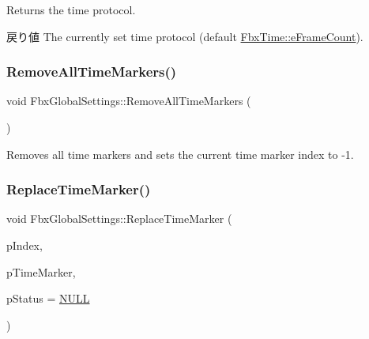Returns the time protocol. \begin{DoxyReturn}{戻り値}
The currently set time protocol (default \hyperlink{class_fbx_time_a10ffa1fdce0aa7f63ec24bdd23afff4bac289d3a9f084368221a07a3c95817bef}{Fbx\+Time\+::e\+Frame\+Count}). 
\end{DoxyReturn}
\mbox{\label{class_fbx_global_settings_ac321c450c9dfd0897993fdcef901bf58}} 
\subsubsection{\texorpdfstring{Remove\+All\+Time\+Markers()}{RemoveAllTimeMarkers()}}
{\footnotesize\ttfamily void Fbx\+Global\+Settings\+::\+Remove\+All\+Time\+Markers (\begin{DoxyParamCaption}{ }\end{DoxyParamCaption})}



Removes all time markers and sets the current time marker index to -\/1. 

\mbox{\label{class_fbx_global_settings_a5b78d64fc99da9327f571d13f222bd8a}} 
\subsubsection{\texorpdfstring{Replace\+Time\+Marker()}{ReplaceTimeMarker()}}
{\footnotesize\ttfamily void Fbx\+Global\+Settings\+::\+Replace\+Time\+Marker (\begin{DoxyParamCaption}\item[{int}]{p\+Index,  }\item[{const \hyperlink{struct_fbx_global_settings_1_1_time_marker}{Time\+Marker} \&}]{p\+Time\+Marker,  }\item[{\hyperlink{class_fbx_status}{Fbx\+Status} $\ast$}]{p\+Status = {\ttfamily \hyperlink{fbxarch_8h_a070d2ce7b6bb7e5c05602aa8c308d0c4}{N\+U\+LL}} }\end{DoxyParamCaption})}

